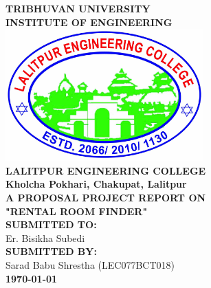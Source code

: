 {
	\thispagestyle{empty}
	\centering
   \fontsize{14pt}{14pt}\selectfont
        	\textbf{\MakeUppercase{Tribhuvan University}}\\
        	\textbf{\MakeUppercase{INSTITUTE OF ENGINEERING}}\\[0.5cm]
        	\includegraphics[width=3in]{lec2.jpg}\\[0.3cm]
        	\textbf{\MakeUppercase{Lalitpur Engineering College}}\\
    	\textbf{Kholcha Pokhari, Chakupat, Lalitpur}\\[1.4cm]
    	
    	\textbf{\MakeUppercase{A proposal project report on}}\\
    	\textbf{"\MakeUppercase{RENTAL ROOM FINDER}"}\\[2cm]
    
    	
    	\textbf{\MakeUppercase{Submitted To:}}\\
    	{Er. Bisikha Subedi}\\[1.2cm]
    	\textbf{\MakeUppercase{Submitted By:}}\\
            {
        	{{Sarad Babu Shrestha (LEC077BCT018)}}\\[1.2cm]
            }	
    	\textbf{\today}\\
}


